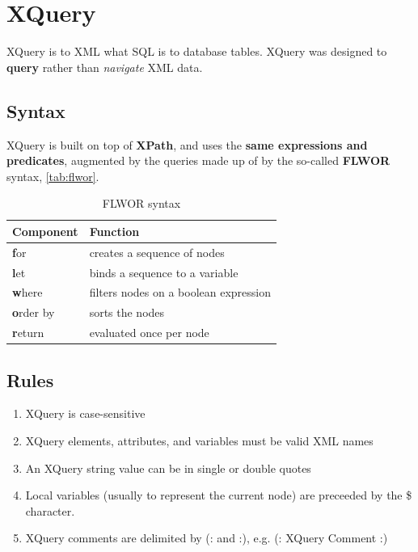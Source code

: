 \documentclass{pgnotes}
\begin{document}
\section{XQuery}

XQuery is to XML what SQL is to database tables.
XQuery was designed to \textbf{query} rather than \textit{navigate} XML data.

\subsection{Syntax}

XQuery is built on top of \textbf{XPath}, and uses the \textbf{same expressions and predicates},  
augmented by the queries made up of by the so-called \textbf{FLWOR} syntax, \autoref{tab:flwor}.

\begin{table}[htbp]
  \begin{tabularx}{1.0\linewidth}{l X}
    \toprule
    \textbf{Component} & \textbf{Function} \\
    \midrule
    \textbf{f}or & creates a sequence of nodes \\
    \textbf{l}et & binds a sequence to a variable \\
    \textbf{w}here & filters nodes on a boolean expression \\
    \textbf{o}rder by & sorts the nodes \\
    \textbf{r}eturn & evaluated once per node \\
    \bottomrule
  \end{tabularx}
  \caption{FLWOR syntax}
  \label{tab:flwor}
\end{table}


\subsection{Rules}

\begin{enumerate}
\item XQuery is case-sensitive
\item XQuery elements, attributes, and variables must be valid XML names
\item An XQuery string value can be in single or double quotes
\item Local variables (usually to represent the current node) are preceeded by the \$ character. 
\item XQuery comments are delimited by (: and :), e.g. (: XQuery Comment :)
\end{enumerate}
\end{document}
